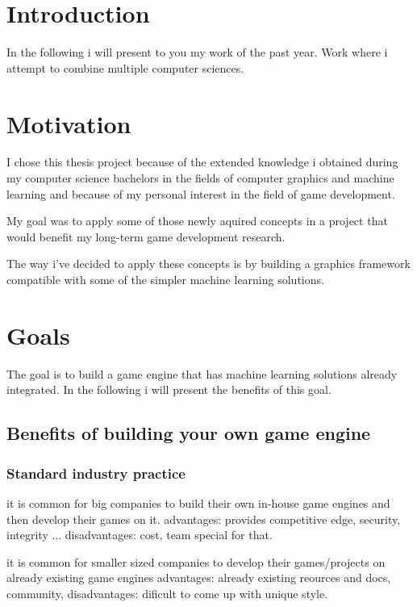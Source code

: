 \chapter{Introduction} 

    In the following i will present to you my work of the past year. Work where i attempt to combine multiple computer sciences. 

\chapter{Motivation}

    I chose this thesis project because of the extended knowledge i obtained during my computer science bachelors in the fields of computer graphics and machine learning and because of my personal interest in the field of game development.

    My goal was to apply some of those newly aquired concepts in a project that would benefit my long-term game development research. 

    The way i've decided to apply these concepts is by building a graphics framework compatible with some of the simpler machine learning solutions.

\chapter{Goals}

    The goal is to build a game engine that has machine learning solutions already integrated. 
    In the following i will present the benefits of this goal.

    \section{Benefits of building your own game engine}
        \subsection{Standard industry practice}
            it is common for big companies to build their own in-house game engines and then develop their games on it.
            advantages:     provides competitive edge, security, integrity ...
            disadvantages:  cost, team special for that.

            it is common for smaller sized companies to develop their games/projects on already existing game engines  
            advantages:     already existing reources and docs, community, 
            disadvantages:  dificult to come up with unique style.

